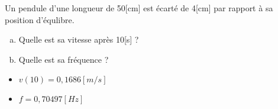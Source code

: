 \begin{exercise}
    Un pendule d'une longueur de 50[cm] est écarté de 4[cm] par rapport à sa position d'équlibre.
    \begin{enumerate}[a)]
        \item Quelle est sa vitesse après 10[s] ?
        \item Quelle est sa fréquence ?
    \end{enumerate}
\end{exercise}
\begin{solution}
    \begin{itemize}
        \item \(v(10)=0,1686 [m/s]\)
        \item \(f=0,70497[Hz]\)
    \end{itemize}
\end{solution}


\begin{minipage}{.5\textwidth}
    \begin{exercise}
    \end{exercise}
\end{minipage}
\begin{minipage}{.5\textwidth}
    \begin{exercise}
    \end{exercise}
\end{minipage}



